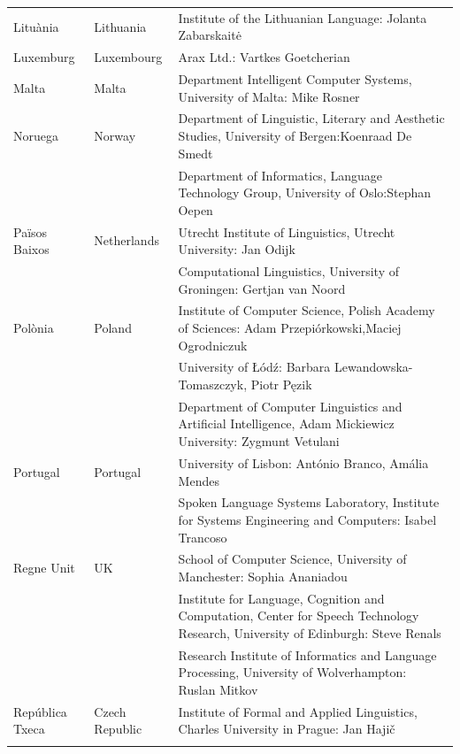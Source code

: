 \begin{longtable}{@{}llp{114mm}@{}}
  Lituània & \textcolor{grey1}{Lithuania} & Institute of the Lithuanian Language: Jolanta Zabarskaitė\\ \addlinespace
  Luxemburg & \textcolor{grey1}{Luxembourg} & Arax Ltd.: Vartkes Goetcherian\\ \addlinespace
  Malta & \textcolor{grey1}{Malta} & Department Intelligent Computer Systems, University of Malta: Mike Rosner\\ \addlinespace
  Noruega & \textcolor{grey1}{Norway} & Department of Linguistic, Literary and Aesthetic Studies, University of Bergen:\newline Koenraad De Smedt\\ \addlinespace 
  & & Department of Informatics, Language Technology Group, University of Oslo:\newline Stephan Oepen \\ \addlinespace
  Països Baixos & \textcolor{grey1}{Netherlands} & Utrecht Institute of Linguistics, Utrecht University: Jan Odijk\\ \addlinespace 
  & & Computational Linguistics, University of Groningen: Gertjan van Noord\\ \addlinespace
  Polònia & \textcolor{grey1}{Poland} & Institute of Computer Science, Polish Academy of Sciences: Adam Przepiórkowski,\newline Maciej Ogrodniczuk \\ \addlinespace
  & & University of Łódź: Barbara Lewandowska-Tomaszczyk, Piotr Pęzik\\ \addlinespace
  & & Department of Computer Linguistics and Artificial Intelligence, Adam Mickiewicz University: Zygmunt Vetulani \\ \addlinespace
  Portugal & \textcolor{grey1}{Portugal} & University of Lisbon: António Branco, Amália Mendes \\ \addlinespace
  & & Spoken Language Systems Laboratory, Institute for Systems Engineering and Computers: Isabel Trancoso \\ \addlinespace
  Regne Unit & \textcolor{grey1}{UK} & 
  School of Computer Science, University of Manchester: Sophia Ananiadou \\ \addlinespace 
  & & Institute for Language, Cognition and Computation, Center for Speech Technology Research, University of Edinburgh: Steve Renals \\ \addlinespace 
  & & Research Institute of Informatics and Language Processing, University of Wolverhampton: Ruslan Mitkov \\ \addlinespace 
  República Txeca & \textcolor{grey1}{Czech Republic} & Institute of Formal and Applied Linguistics, Charles University in Prague: Jan Hajič \\ \addlinespace

\end{longtable}
